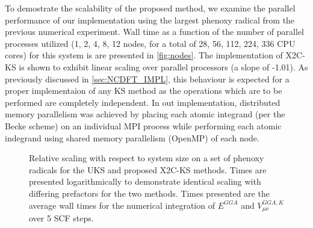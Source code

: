 To demostrate the scalability of the proposed method, we examine the parallel
performance of our implementation using the largest phenoxy radical from the
previous numerical experiment. Wall time as a function of the number of 
parallel processes utilized (1, 2, 4, 8, 12 nodes, for a total of 28, 56, 112, 224, 336 CPU cores)
for this system is are presented in \cref{fig:nodes}. The implementation of X2C-KS
is shown to exhibit linear scaling over parallel processors (a slope of -1.01).
As previously discussed in \cref{sec:NCDFT_IMPL}, this behaviour is expected
for a proper implementaion of any KS method as the operations which are to be performed
are completely independent. In out implementation, distributed memory parallelism
was achieved by placing each atomic integrand (per the Becke scheme) on
an individual MPI process while performing each atomic indegrand using shared
memory parallelism (OpenMP) of each node.

\begin{figure}
\begin{center}
\end{center}
\caption{
Relative scaling with respect to system size on a set of phenoxy radicals for
the UKS and proposed X2C-KS methods. Times are presented logarithmically to
demonstrate identical scaling with differing prefactors for the two methods.
Times presented are the average wall times for the numerical integration of
$E^{GGA}$ and $V_{\mu\nu}^{GGA,K}$ over 5 SCF steps.  
}
\label{fig:timing}     
\end{figure}

